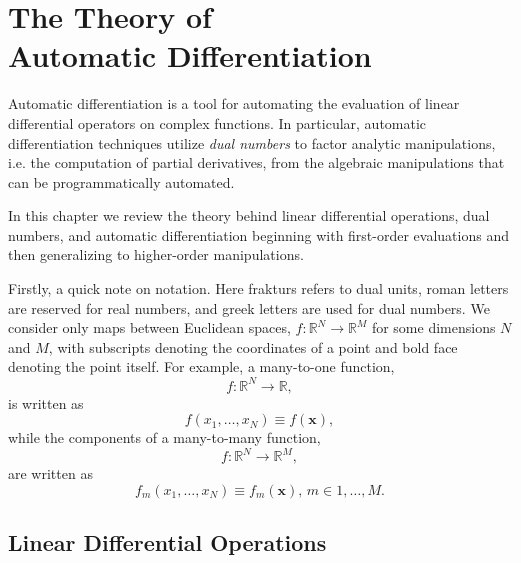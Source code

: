 \chapter{The Theory of \\ Automatic Differentiation}

Automatic differentiation is a tool for automating the evaluation of linear differential
operators on complex functions.  In particular, automatic differentiation techniques
utilize \textit{dual numbers} to factor analytic manipulations, i.e. the computation of
partial derivatives, from the algebraic manipulations that can be programmatically
automated.

In this chapter we review the theory behind linear differential operations, dual numbers,
and automatic differentiation beginning with first-order evaluations and then generalizing 
to higher-order manipulations.

Firstly, a quick note on notation.  Here frakturs refers to dual units, roman letters are 
reserved for real numbers, and greek letters are used for dual numbers.  We consider 
only maps between Euclidean spaces, $f : \mathbb{R}^{N} \rightarrow \mathbb{R}^{M}$ 
for some dimensions $N$ and $M$, with subscripts denoting the coordinates of a point
and bold face denoting the point itself. For example, a many-to-one function,
%
\begin{equation*}
f : \mathbb{R}^{N} \rightarrow \mathbb{R},
\end{equation*}
%
is written as
%
\begin{equation*}
f \! \left( x_{1}, \ldots, x_{N} \right) \equiv f \! \left( \mathbf{x} \right),
\end{equation*} 
%
while the components of a many-to-many function,
%
\begin{equation*}
f : \mathbb{R}^{N} \rightarrow \mathbb{R}^{M},
\end{equation*}
%
are written as
%
\begin{equation*}
f_{m} \! \left( x_{1}, \ldots, x_{N} \right) \equiv f_{m} \! \left( \mathbf{x} \right), \, m \in 1, \ldots, M.
\end{equation*} 

\section{Linear Differential Operations}

